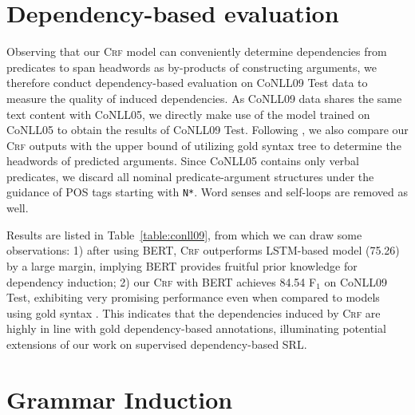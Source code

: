 \documentclass[11pt]{article}
\begin{document}
\section{Dependency-based evaluation}\label{sec:tree-probing}



Observing that our \textsc{Crf} model can conveniently determine dependencies from predicates to span headwords as by-products of constructing arguments, we therefore conduct dependency-based evaluation on CoNLL09 Test data \cite{hajic-etal-2009-conll} to measure the quality of induced dependencies.
As CoNLL09 data shares the same text content with CoNLL05, we directly make use of the model trained on CoNLL05 to obtain the results of CoNLL09 Test.
Following \citet{johansson-nugues-2008-dependency-based,li-etal-2019-dependency}, we also compare our \textsc{Crf} outputs with the upper bound of utilizing gold syntax tree to determine the headwords of predicted arguments.
Since CoNLL05 contains only verbal predicates, we discard all nominal predicate-argument structures under the guidance of POS tags starting with \texttt{N*}.
Word senses and self-loops are removed as well.

Results are listed in Table~\ref{table:conll09}, from which we can draw some observations:
1) after using BERT, \textsc{Crf} outperforms LSTM-based model (75.26) by a large margin, implying BERT provides fruitful prior knowledge for dependency induction;
2) our \textsc{Crf} with BERT achieves 84.54 F$_1$ on CoNLL09 Test, exhibiting very promising performance even when compared to models using gold syntax \cite{johansson-nugues-2008-dependency-based,li-etal-2019-dependency}.
This indicates that the dependencies induced by \textsc{Crf} are highly in line with gold dependency-based annotations, illuminating potential extensions of our work on supervised dependency-based SRL.

\section{Grammar Induction}\label{sec:induction}
\end{document}

